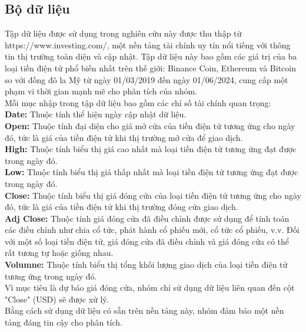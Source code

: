 \documentclass[conference]{IEEEtran}
\begin{document}
\subsection{Bộ dữ liệu}\label{AA}
Tập dữ liệu được sử dụng trong nghiên cứu này được thu thập từ https://www.investing.com/, một nền tảng tài chính uy tín nổi tiếng với thông tin thị trường toàn diện và cập nhật. Tập dữ liệu này bao gồm các giá trị của ba loại tiền điện tử phổ biến nhất trên thế giới: Binance Coin, Ethereum và Bitcoin so với đồng đô la Mỹ từ ngày 01/03/2019 đến ngày 01/06/2024, cung cấp một phạm vi thời gian mạnh mẽ cho phân tích của nhóm.\\
Mỗi mục nhập trong tập dữ liệu bao gồm các chỉ số tài chính quan trọng:\\
\textbf{Date:} Thuộc tính thể hiện ngày cập nhật dữ liệu.\\
\textbf{Open:} Thuộc tính đại diện cho giá mở cửa của tiền điện tử tương ứng cho ngày đó, tức là giá của tiền điện tử khi thị trường mở cửa để giao dịch.\\
\textbf{High:} Thuộc tính biểu thị giá cao nhất mà loại tiền điện tử tương ứng đạt được trong ngày đó.\\
\textbf{Low:} Thuộc tính biểu thị giá thấp nhất mà loại tiền điện tử tương ứng đạt được trong ngày đó.\\
\textbf{Close:} Thuộc tính biểu thị giá đóng cửa của loại tiền điện tử tương ứng cho ngày đó, tức là giá của tiền điện tử khi thị trường đóng cửa giao dịch.\\
\textbf{Adj Close:} Thuộc tính giá đóng cửa đã điều chỉnh được sử dụng để tính toán các điều chỉnh như chia cổ tức, phát hành cổ phiếu mới, cổ tức cổ phiếu, v.v. Đối với một số loại tiền điện tử, giá đóng cửa đã điều chỉnh và giá đóng cửa có thể rất tương tự hoặc giống nhau.\\
\textbf{Volumne:} Thuộc tính biểu thị tổng khối lượng giao dịch của loại tiền điện tử tương ứng trong ngày đó.\\
Vì mục tiêu là dự báo giá đóng cửa, nhóm chỉ sử dụng dữ liệu liên quan đến cột "Close" (USD) sẽ được xử lý.\\
Bằng cách sử dụng dữ liệu có sẵn trên nền tảng này, nhóm đảm bảo một nền tảng đáng tin cậy cho phân tích.
\end{document}
